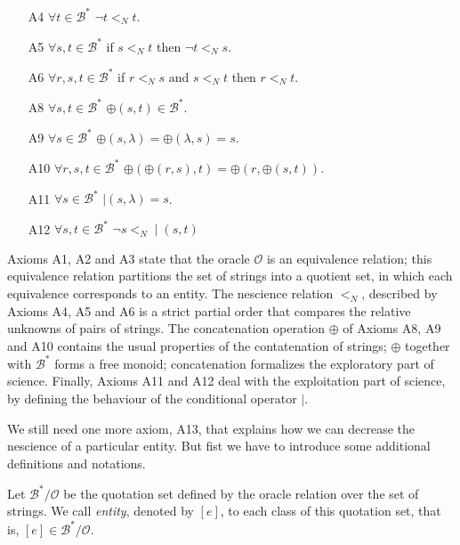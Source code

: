 \begin{definition}
\begin{itemize}
\item[A4] $\forall t \in \mathcal{B}^\ast$ $\lnot t <_N t$.
\item[A5] $\forall s , t \in \mathcal{B}^\ast$ if $s <_N t$ then $\lnot t <_N s$.
\item[A6] $\forall r , s, t \in \mathcal{B}^\ast$ if $r <_N s$ and $s <_N t$ then $r <_N t$.

\vskip 0.25cm

\item[A8] $\forall s, t \in \mathcal{B}^\ast$ $\oplus(s, t) \in \mathcal{B}^\ast$.
\item[A9] $\forall s \in \mathcal{B}^\ast$ $\oplus(s, \lambda) = \oplus( \lambda, s) = s$.
\item[A10] $\forall r, s, t \in \mathcal{B}^\ast$ $\oplus(\oplus(r, s), t) = \oplus(r, \oplus(s, t))$.

\vskip 0.25cm

\item[A11] $\forall s \in \mathcal{B}^\ast$ $\mid (s, \lambda) = s$.
\item[A12] $\forall s, t \in \mathcal{B}^\ast$ $\lnot s <_N \mid (s, t)$

\end{itemize}

\end{definition}

Axioms A1, A2 and A3 state that the oracle $\mathcal{O}$ is an equivalence relation; this equivalence relation partitions the set of strings into a quotient set, in which each equivalence corresponds to an entity. The nescience relation $<_N$, described by Axioms A4, A5 and A6 is a strict partial order that compares the relative unknowns of pairs of strings. The concatenation operation $\oplus$ of Axioms A8, A9 and A10 contains the usual properties of the contatenation of strings; $\oplus$ together with $\mathcal{B}^\ast$ forms a free monoid; concatenation formalizes the exploratory part of science. Finally, Axioms A11 and A12 deal with the exploitation part of science, by defining the behaviour of the conditional operator $\mid$. 

We still need one more axiom, A13, that explains how we can decrease the nescience of a particular entity. But fist we have to introduce some additional definitions and notations.

\begin{definition}
Let $\mathcal{B}^\ast / \mathcal{O}$ be the quotation set defined by the oracle relation over the set of strings. We call \emph{entity}, denoted by $[e]$, to each class of this quotation set, that is, $[e] \in \mathcal{B}^\ast / \mathcal{O}$.
\end{definition}

